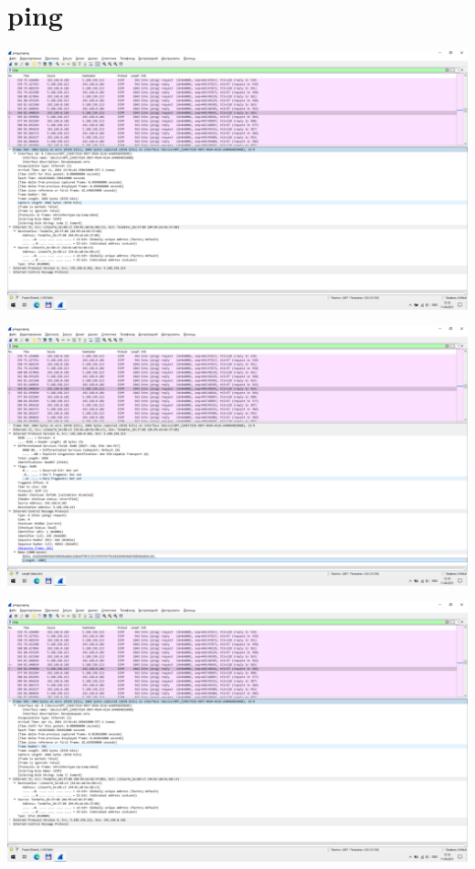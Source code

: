 
\section{ping}

\includegraphics[width=\textwidth]{screenshots/ping_1000_request_1}

\includegraphics[width=\textwidth]{screenshots/ping_1000_request_2}

\includegraphics[width=\textwidth]{screenshots/ping_1000_response_1}

